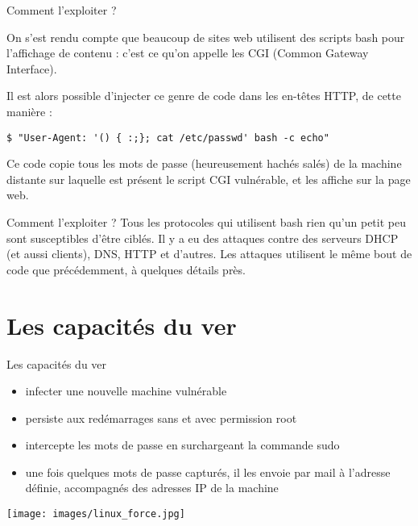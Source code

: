 \documentclass[11pt]{beamer}
\begin{document}
\begin{frame}[fragile]{Comment l'exploiter ?}

On s'est rendu compte que beaucoup de sites web utilisent des scripts bash pour l'affichage de contenu : c'est ce qu'on appelle les CGI (Common Gateway Interface).

Il est alors possible d'injecter ce genre de code dans les en-têtes HTTP, de cette manière :

\begin{lstlisting}
$ "User-Agent: '() { :;}; cat /etc/passwd' bash -c echo"
\end{lstlisting}

Ce code copie tous les mots de passe (heureusement hachés salés) de la machine distante sur laquelle est présent le script CGI vulnérable, et les affiche sur la page web.

\end{frame}

\begin{frame}{Comment l'exploiter ?}
Tous les protocoles qui utilisent bash rien qu'un petit peu sont susceptibles d'être ciblés. Il y a eu des attaques contre des serveurs DHCP (et aussi clients), DNS, HTTP et d'autres. 
Les attaques utilisent le même bout de code que précédemment, à quelques détails près.

\end{frame}


\section{Les capacités du ver}
\begin{frame}{Les capacités du ver}

\begin{itemize}
\item infecter une nouvelle machine vulnérable
\item persiste aux redémarrages sans et avec permission root 
\item intercepte les mots de passe en surchargeant la commande sudo
\item une fois quelques mots de passe capturés, il les envoie par mail à l'adresse définie, accompagnés des adresses IP de la machine
\end{itemize}


\begin{center}
\texttt{[image: images/linux\_force.jpg]}
\end{center}
\end{frame}
\end{document}

